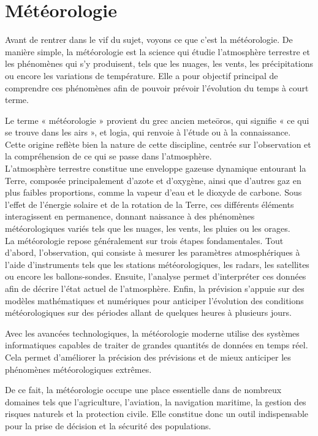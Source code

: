 \clearpage
\section{Météorologie}
Avant de rentrer dans le vif du sujet, voyons ce que c'est la météorologie. De manière simple, la météorologie est la science qui étudie l’atmosphère terrestre et les phénomènes qui s’y produisent, tels que les nuages, les vents, les précipitations ou encore les variations de température. Elle a pour objectif principal de comprendre ces phénomènes afin de pouvoir prévoir l’évolution du temps à court terme.

\noindent Le terme « météorologie » provient du grec ancien meteōros, qui signifie « ce qui se trouve dans les airs », et logia, qui renvoie à l’étude ou à la connaissance. Cette origine reflète bien la nature de cette discipline, centrée sur l’observation et la compréhension de ce qui se passe dans l’atmosphère.\\ 

\noindent L’atmosphère terrestre constitue une enveloppe gazeuse dynamique entourant la Terre, composée principalement d’azote et d’oxygène, ainsi que d’autres gaz en plus faibles proportions, comme la vapeur d’eau et le dioxyde de carbone. Sous l’effet de l’énergie solaire et de la rotation de la Terre, ces différents éléments interagissent en permanence, donnant naissance à des phénomènes météorologiques variés tels que les nuages, les vents, les pluies ou les orages.\\

\noindent La météorologie repose généralement sur trois étapes fondamentales. Tout d’abord, l’observation, qui consiste à mesurer les paramètres atmosphériques à l’aide d’instruments tels que les stations météorologiques, les radars, les satellites ou encore les ballons-sondes. Ensuite, l’analyse permet d’interpréter ces données afin de décrire l’état actuel de l’atmosphère. Enfin, la prévision s’appuie sur des modèles mathématiques et numériques pour anticiper l’évolution des conditions météorologiques sur des périodes allant de quelques heures à plusieurs jours.

\noindent Avec les avancées technologiques, la météorologie moderne utilise des systèmes informatiques capables de traiter de grandes quantités de données en temps réel. Cela permet d’améliorer la précision des prévisions et de mieux anticiper les phénomènes météorologiques extrêmes. 

\noindent De ce fait, la météorologie occupe une place essentielle dans de nombreux domaines tels que l’agriculture, l’aviation, la navigation maritime, la gestion des risques naturels et la protection civile. Elle constitue donc un outil indispensable pour la prise de décision et la sécurité des populations.





